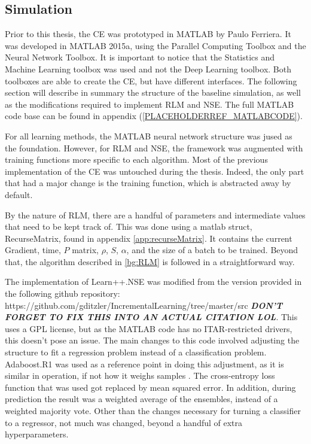 \subsection{Simulation}
\par Prior to this thesis, the CE was prototyped in MATLAB by Paulo Ferriera\cite{placeholder_pauloPaper}. It was developed in MATLAB 2015a, using the Parallel Computing Toolbox and the Neural Network Toolbox. It is important to notice that the Statistics and Machine Learning toolbox was used and not the Deep Learning toolbox. Both toolboxes are able to create the CE, but have different interfaces. The following section will describe in summary the structure of the baseline simulation, as well as the modifications required to implement RLM and NSE. The full MATLAB code base can be found in appendix (\ref{PLACEHOLDERREF_MATLABCODE}).
\par For all learning methods, the MATLAB neural network structure was jused as the foundation. However, for RLM and NSE, the framework was augmented with training functions more specific to each algorithm. Most of the previous implementation of the CE was untouched during the thesis. Indeed, the only part that had a major change is the training function, which is abstracted away by default. 
\par By the nature of RLM, there are a handful of parameters and intermediate values that need to be kept track of. This was done using a matlab struct, RecurseMatrix, found in appendix \ref{app:recurseMatrix}. It contains the current Gradient, time, $P$ matrix, $\rho$, $S$, $\alpha$, and the size of a batch to be trained. Beyond that, the algorithm described in \ref{bg:RLM} is followed in a straightforward way.   
\par  The implementation of Learn++.NSE was modified from the version provided in the following github repository: https://github.com/gditzler/IncrementalLearning/tree/master/src \textbf{\textit{DON'T FORGET TO FIX THIS INTO AN ACTUAL CITATION LOL}}. This uses a GPL license, but as the MATLAB code has no ITAR-restricted drivers, this doesn't pose an issue. The main changes to this code involved adjusting the structure to fit a regression problem instead of a classification problem. Adaboost.R1 was used as a reference point in doing this adjustment, as it is similar in operation, if not how it weighs samples \cite{lol_adaboost}. The cross-entropy loss function that was used got replaced by mean squared error. In addition, during prediction the result was a weighted average of the ensembles, instead of a weighted majority vote. Other than the changes necessary for turning a classifier to a regressor, not much was changed, beyond a handful of extra hyperparameters. 

